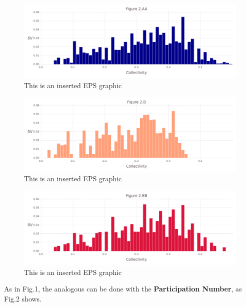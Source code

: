 \documentclass[10pt,letterpaper]{article}
\begin{document}
\begin{figure}[ht]
\begin{center}
\includegraphics[scale=0.5]{1hvr_hol/2aafigure.pdf}
\caption{This is an inserted EPS graphic}
\label{fig4}
\end{center}
\end{figure}

\begin{figure}[ht]
\begin{center}
\includegraphics[scale=0.5]{1hvr_hol/2bfigure.pdf}
\caption{This is an inserted EPS graphic}
\label{fig5}
\end{center}
\end{figure}

\begin{figure}[ht]
\begin{center}
\includegraphics[scale=0.5]{1hvr_hol/2bbfigure.pdf}
\caption{This is an inserted EPS graphic}
\label{fig6}
\end{center}
\end{figure}

\clearpage
As in Fig.1, the analogous can be done with the \textbf{Participation Number}, as Fig.2 shows.
\end{document}
